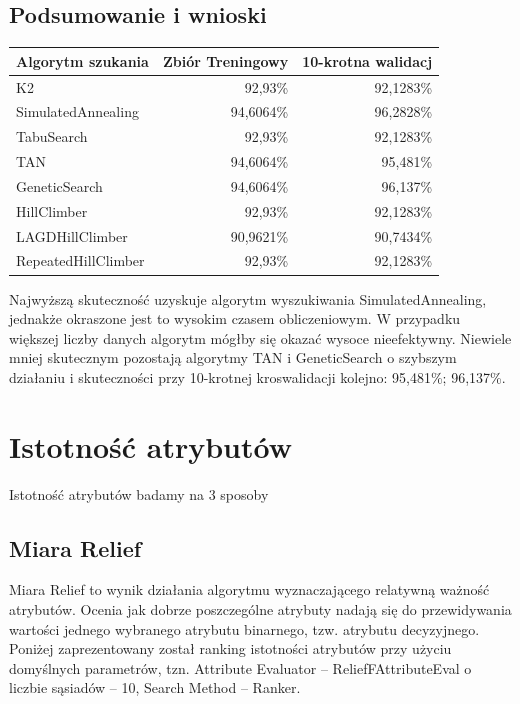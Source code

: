 \documentclass{classrep}
\begin{document}
\subsection{Podsumowanie i wnioski}
\begin{tabular}{|l|r|r|}
  \hline 
  Algorytm szukania & Zbiór Treningowy & 10-krotna walidacj \\
  \hline
  K2 & 92,93\% & 92,1283\% \\
  \hline
  SimulatedAnnealing & 94,6064\% & 96,2828\% \\
  \hline
  TabuSearch & 92,93\% & 92,1283\% \\
  \hline
  TAN & 94,6064\% & 95,481\% \\
  \hline
  GeneticSearch & 94,6064\% & 96,137\% \\ 
  \hline
  HillClimber & 92,93\% & 92,1283\% \\
  \hline
  LAGDHillClimber & 90,9621\% & 90,7434\% \\
  \hline
  RepeatedHillClimber & 92,93\% & 92,1283\% \\
  \hline
\end{tabular} \smallskip

Najwyższą skuteczność uzyskuje algorytm wyszukiwania SimulatedAnnealing, jednakże okraszone jest to wysokim czasem obliczeniowym. W przypadku większej liczby danych algorytm mógłby się okazać wysoce nieefektywny. Niewiele mniej skutecznym pozostają algorytmy TAN i GeneticSearch o szybszym działaniu i skuteczności przy 10-krotnej kroswalidacji kolejno: 95,481\%; 96,137\%.

 

\section{Istotność atrybutów}

Istotność atrybutów badamy na 3 sposoby
\subsection{Miara Relief}
Miara Relief to wynik działania algorytmu wyznaczającego relatywną ważność atrybutów. Ocenia jak dobrze poszczególne atrybuty nadają się do przewidywania wartości jednego wybranego atrybutu binarnego, tzw. atrybutu decyzyjnego. Poniżej zaprezentowany został ranking istotności atrybutów przy użyciu domyślnych parametrów, tzn. Attribute Evaluator – ReliefFAttributeEval o liczbie sąsiadów – 10, Search Method – Ranker. 
\end{document}
